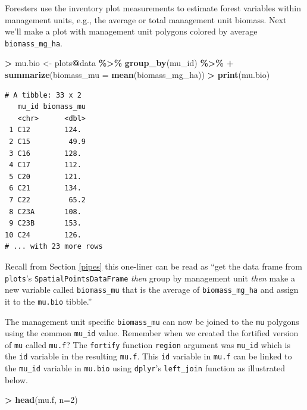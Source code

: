 \documentclass[
]{krantz}
\makeatletter
\newenvironment{Shaded}{\begin{snugshade}}{\end{snugshade}}
\newcommand{\DataTypeTok}[1]{\textcolor[rgb]{0.27,0.27,0.27}{#1}}
\newcommand{\DecValTok}[1]{\textcolor[rgb]{0.06,0.06,0.06}{#1}}
\newcommand{\KeywordTok}[1]{\textcolor[rgb]{0.27,0.27,0.27}{\textbf{#1}}}
\newcommand{\NormalTok}[1]{#1}
\newcommand{\OperatorTok}[1]{\textcolor[rgb]{0.43,0.43,0.43}{\textbf{#1}}}
\newcommand{\StringTok}[1]{\textcolor[rgb]{0.5,0.5,0.5}{#1}}
\newenvironment{kframe}{%
\medskip{}
\setlength{\fboxsep}{.8em}
 \def\at@end@of@kframe{}%
 \ifinner\ifhmode%
  \def\at@end@of@kframe{\end{minipage}}%
  \begin{minipage}{\columnwidth}%
 \fi\fi%
 \def\FrameCommand##1{\hskip\@totalleftmargin \hskip-\fboxsep
 \colorbox{shadecolor}{##1}\hskip-\fboxsep
     \hskip-\linewidth \hskip-\@totalleftmargin \hskip\columnwidth}%
 \MakeFramed {\advance\hsize-\width
   \@totalleftmargin\z@ \linewidth\hsize
   \@setminipage}}%
 {\par\unskip\endMakeFramed%
 \at@end@of@kframe}
\renewenvironment{Shaded}{\begin{kframe}}{\end{kframe}}
\makeatother
\begin{document}
Foresters use the inventory plot measurements to estimate forest variables within management units, e.g., the average or total management unit biomass. Next we'll make a plot with management unit polygons colored by average \texttt{biomass\_mg\_ha}.

\begin{Shaded}
\begin{Highlighting}[]
\OperatorTok{\textgreater{}}\StringTok{ }\NormalTok{mu.bio \textless{}{-}}\StringTok{ }\NormalTok{plots}\OperatorTok{@}\NormalTok{data }\OperatorTok{\%\textgreater{}\%}\StringTok{ }\KeywordTok{group\_by}\NormalTok{(mu\_id) }\OperatorTok{\%\textgreater{}\%}\StringTok{ }
\OperatorTok{+}\StringTok{     }\KeywordTok{summarize}\NormalTok{(}\DataTypeTok{biomass\_mu =} \KeywordTok{mean}\NormalTok{(biomass\_mg\_ha))}
\OperatorTok{\textgreater{}}\StringTok{ }\KeywordTok{print}\NormalTok{(mu.bio)}
\end{Highlighting}
\end{Shaded}

\begin{verbatim}
# A tibble: 33 x 2
   mu_id biomass_mu
   <chr>      <dbl>
 1 C12        124. 
 2 C15         49.9
 3 C16        128. 
 4 C17        112. 
 5 C20        121. 
 6 C21        134. 
 7 C22         65.2
 8 C23A       108. 
 9 C23B       153. 
10 C24        126. 
# ... with 23 more rows
\end{verbatim}

Recall from Section \ref{pipes} this one-liner can be read as ``get the data frame from \texttt{plots}'s \texttt{SpatialPointsDataFrame} \emph{then} group by management unit \emph{then} make a new variable called \texttt{biomass\_mu} that is the average of \texttt{biomass\_mg\_ha} and assign it to the \texttt{mu.bio} tibble.''

The management unit specific \texttt{biomass\_mu} can now be joined to the \texttt{mu} polygons using the common \texttt{mu\_id} value. Remember when we created the fortified version of \texttt{mu} called \texttt{mu.f}? The \texttt{fortify} function \texttt{region} argument was \texttt{mu\_id} which is the \texttt{id} variable in the resulting \texttt{mu.f}. This \texttt{id} variable in \texttt{mu.f} can be linked to the \texttt{mu\_id} variable in \texttt{mu.bio} using \texttt{dplyr}'s \texttt{left\_join} function as illustrated below.

\begin{Shaded}
\begin{Highlighting}[]
\OperatorTok{\textgreater{}}\StringTok{ }\KeywordTok{head}\NormalTok{(mu.f, }\DataTypeTok{n=}\DecValTok{2}\NormalTok{)}
\end{Highlighting}
\end{Shaded}
\end{document}
